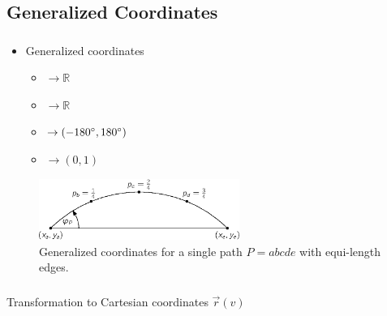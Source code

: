 \subsection{Generalized Coordinates}
\label{subsect:application-generalized-coordinates}

\begin{frame}
  \frametitle{\insertsubsection}
  \begin{itemize}
    \item Generalized coordinates \begin{itemize}
      \item {} ${\to \mathbb{R}}$
      \item {} ${\to \mathbb{R}}$
      \item \makebox[.5cm]{\hfill$\varphi \colon$}\makebox[.9cm]{\hfill$\Pi\phantom{)}$} ${\to (-180 ^{\circ}, 180 ^{\circ})}$
      \item {} ${\to (0, 1)}$
    \end{itemize}
  \end{itemize}
  \begin{figure}
    \includegraphics[height=2.0cm]{Resources/Generalized-Coordinates-Example.eps}
    \caption{Generalized coordinates for a single path ${P = abcde}$ with equi-length edges.}
  \end{figure}
\end{frame}

\begin{frame}[c]
  \frametitle{\insertsubsection}
  \begin{algorithm}[H]
    \caption{Transformation to Cartesian coordinates ${\vec{r}(v)}$}
    \;
    \;
  \end{algorithm}
\end{frame}
